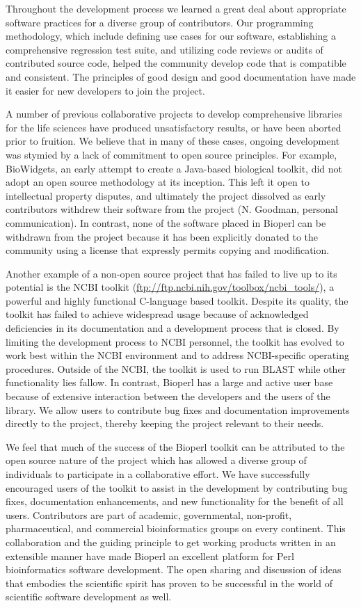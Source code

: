 \documentclass[12pt]{article}
\begin{document}
Throughout the development process we learned a great deal about
appropriate software practices for a diverse group of contributors.
Our programming methodology, which include defining use cases for
our software, establishing a comprehensive regression test suite, and
utilizing code reviews or audits of contributed source code, helped
the community develop code that is compatible and consistent.  The
principles of good design and good documentation have made it easier
for new developers to join the project.

A number of previous collaborative projects to develop comprehensive
libraries for the life sciences have produced unsatisfactory results,
or have been aborted prior to fruition.  We believe that in many of
these cases, ongoing development was stymied by a lack of commitment
to open source principles.  For example, BioWidgets, an early attempt
to create a Java-based biological toolkit, did not adopt an open
source methodology at its inception.  This left it open to
intellectual property disputes, and ultimately the project dissolved
as early contributors withdrew their software from the project
(N. Goodman, personal communication).  In contrast, none of the
software placed in Bioperl can be withdrawn from the project because
it has been explicitly donated to the community using a license that
expressly permits copying and modification.

Another example of a non-open source project that has failed to live
up to its potential is the NCBI toolkit
(\url{ftp://ftp.ncbi.nih.gov/toolbox/ncbi_tools/}), a powerful and
highly functional C-language based toolkit.  Despite its quality, the
toolkit has failed to achieve widespread usage because of acknowledged
deficiencies in its documentation and a development process that is
closed.  By limiting the development process to NCBI personnel, the
toolkit has evolved to work best within the NCBI environment and to
address NCBI-specific operating procedures.  Outside of the NCBI, the
toolkit is used to run BLAST while other functionality lies fallow.
In contrast, Bioperl has a large and active user base because of
extensive interaction between the developers and the users of the
library.  We allow users to contribute bug fixes and documentation
improvements directly to the project, thereby keeping the project
relevant to their needs.

We feel that much of the success of the Bioperl toolkit can be
attributed to the open source nature of the project which has allowed
a diverse group of individuals to participate in a collaborative effort.
We have successfully encouraged users of the toolkit to assist in the
development by contributing bug fixes, documentation enhancements, and
new functionality for the benefit of all users.  Contributors are part
of academic, governmental, non-profit, pharmaceutical, and
commercial bioinformatics groups on every continent.  This collaboration and
the guiding principle to get working products written in an extensible
manner have made Bioperl an excellent platform for Perl bioinformatics
software development.  The open sharing and discussion of ideas that
embodies the scientific spirit has proven to be successful in the
world of scientific software development as well.  
\end{document}
